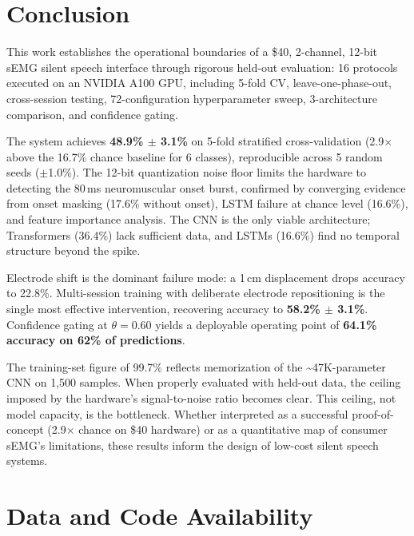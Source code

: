 \documentclass{article}
\begin{document}
\section{Conclusion}
\label{sec:conclusion}

This work establishes the operational boundaries of a \$40, 2-channel, 12-bit sEMG silent speech interface through rigorous held-out evaluation: 16 protocols executed on an NVIDIA A100 GPU, including 5-fold CV, leave-one-phase-out, cross-session testing, 72-configuration hyperparameter sweep, 3-architecture comparison, and confidence gating.

The system achieves \textbf{48.9\% $\pm$ 3.1\%} on 5-fold stratified cross-validation (2.9$\times$ above the 16.7\% chance baseline for 6 classes), reproducible across 5 random seeds ($\pm$1.0\%). The 12-bit quantization noise floor limits the hardware to detecting the 80\,ms neuromuscular onset burst, confirmed by converging evidence from onset masking (17.6\% without onset), LSTM failure at chance level (16.6\%), and feature importance analysis. The CNN is the only viable architecture; Transformers (36.4\%) lack sufficient data, and LSTMs (16.6\%) find no temporal structure beyond the spike.

Electrode shift is the dominant failure mode: a 1\,cm displacement drops accuracy to 22.8\%. Multi-session training with deliberate electrode repositioning is the single most effective intervention, recovering accuracy to \textbf{58.2\% $\pm$ 3.1\%}. Confidence gating at $\theta = 0.60$ yields a deployable operating point of \textbf{64.1\% accuracy on 62\% of predictions}.

The training-set figure of 99.7\% reflects memorization of the \textasciitilde47K-parameter CNN on 1,500 samples. When properly evaluated with held-out data, the ceiling imposed by the hardware's signal-to-noise ratio becomes clear. This ceiling, not model capacity, is the bottleneck. Whether interpreted as a successful proof-of-concept (2.9$\times$ chance on \$40 hardware) or as a quantitative map of consumer sEMG's limitations, these results inform the design of low-cost silent speech systems.

\section*{Data and Code Availability}
\end{document}
